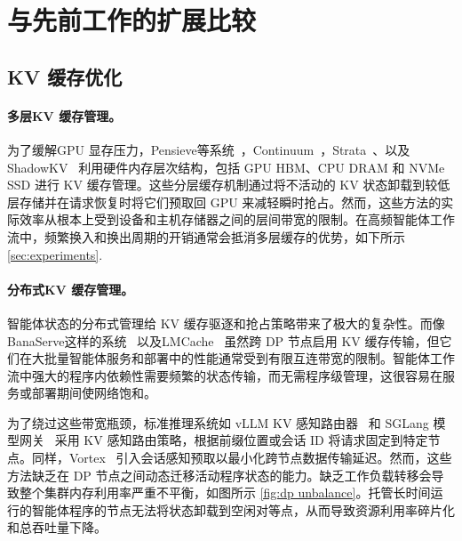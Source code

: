 \section{与先前工作的扩展比较}
\subsection{KV 缓存优化}
\label{appendx: kv opt}
\paragraph{多层KV 缓存管理。}
为了缓解GPU 显存压力，Pensieve等系统~\citep{Yu_2025}，Continuum~\cite{li2025continuumefficientrobustmultiturn}，Strata~\citep{xie2025stratahierarchicalcontextcaching}、以及ShadowKV~\citep{sun2025shadowkvkvcacheshadows} 利用硬件内存层次结构，包括 GPU HBM、CPU DRAM 和 NVMe SSD 进行 KV 缓存管理。这些分层缓存机制通过将不活动的 KV 状态卸载到较低层存储并在请求恢复时将它们预取回 GPU 来减轻瞬时抢占。然而，这些方法的实际效率从根本上受到设备和主机存储器之间的层间带宽的限制。在高频智能体工作流中，频繁换入和换出周期的开销通常会抵消多层缓存的优势，如下所示 \autoref{sec:experiments}.



\paragraph{分布式KV 缓存管理。}
智能体状态的分布式管理给 KV 缓存驱逐和抢占策略带来了极大的复杂性。而像BanaServe这样的系统~\citep{he2025banaserveunifiedkvcache} 以及LMCache~\citep{liu2025lmcacheefficientkvcache} 虽然跨 DP 节点启用 KV 缓存传输，但它们在大批量智能体服务和部署中的性能通常受到有限互连带宽的限制。智能体工作流中强大的程序内依赖性需要频繁的状态传输，而无需程序级管理，这很容易在服务或部署期间使网络饱和。

为了绕过这些带宽瓶颈，标准推理系统如 vLLM KV 感知路由器~\citep{vllm_kvaware_routing} 和 SGLang 模型网关~\citep{zheng2024sglangefficientexecutionstructured} 采用 KV 感知路由策略，根据前缀位置或会话 ID 将请求固定到特定节点。同样，Vortex~\citep{yuan2025vortexovercomingmemorycapacity} 引入会话感知预取以最小化跨节点数据传输延迟。然而，这些方法缺乏在 DP 节点之间动态迁移活动程序状态的能力。缺乏工作负载转移会导致整个集群内存利用率严重不平衡，如图所示 \autoref{fig:dp unbalance}。托管长时间运行的智能体程序的节点无法将状态卸载到空闲对等点，从而导致资源利用率碎片化和总吞吐量下降。

